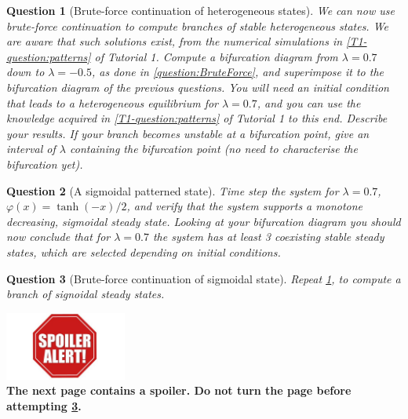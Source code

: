 \documentclass[a4paper]{siamart220329}
\theoremstyle{plain}
\newtheorem{question}{Question}
\begin{document}
\begin{question}[Brute-force continuation of heterogeneous states]
  \label{question:BruteForceHom}
  We can now
use brute-force continuation to compute branches of stable heterogeneous states. We
are aware that such solutions exist, from the numerical simulations in
\cref{T1-question:patterns} of Tutorial 1.
Compute a bifurcation diagram from $\lambda=0.7$ down to $\lambda=-0.5$, as done in
\cref{question:BruteForce}, and superimpose it to the bifurcation diagram of the
previous questions. You will need an initial condition that leads to a heterogeneous
equilibrium for $\lambda = 0.7$, and you can use the knowledge acquired in
\cref{T1-question:patterns} of Tutorial 1 to this end. Describe your results. If your
branch becomes unstable at a
bifurcation point, give an interval of $\lambda$ containing the bifurcation point (no
need to characterise the bifurcation yet).
\end{question}

\begin{question}[A sigmoidal patterned state] \label{question:bruteSigmoidal}
  Time step the system for
$\lambda =0.7$, $\varphi(x) = \tanh(-x)/2$, and verify that the system supports a
monotone decreasing, sigmoidal steady state. Looking at your bifurcation diagram you
should now conclude that for $\lambda =0.7$ the system has at least 3 coexisting
stable steady states, which are selected depending on initial conditions.
\end{question}

\begin{question}[Brute-force continuation of sigmoidal state]
  \label{question:bruteForcePatterned}
  Repeat
  \cref{question:BruteForceHom}, to compute a branch of signoidal steady states.
\end{question}

\vspace{3cm}
\begin{center}
  \includegraphics[width = 0.3\textwidth]{spoiler}\\
  \textbf{The next page contains a spoiler. Do not turn the page before
  attempting \cref{question:bruteForcePatterned}.}
\end{center}
\newpage
\end{document}
